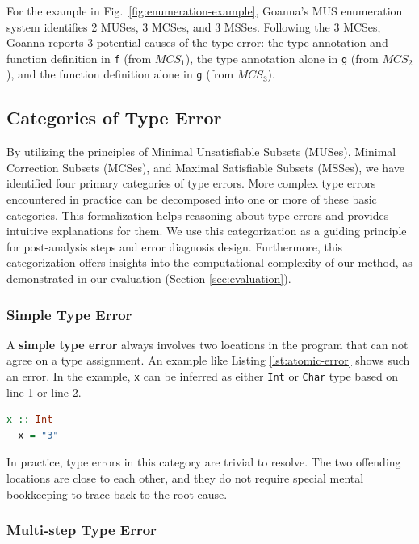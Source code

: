 \documentclass[pdflatex,lineno,sn-nature,Numbered]{sn-jnl}%
\begin{document}
   For the example in Fig.~\ref{fig:enumeration-example}, Goanna's MUS enumeration system identifies 2 MUSes, 3 MCSes, and 3 MSSes. Following the 3 MCSes, Goanna reports 3 potential causes of the type error: the type annotation and function definition in \texttt{f} (from $MCS_1$), the type annotation alone in \texttt{g} (from $MCS_2$), and the function definition alone in \texttt{g} (from $MCS_3$). 


\subsection{Categories of Type Error} \label{sec:categories}

By utilizing the principles of Minimal Unsatisfiable Subsets (MUSes), Minimal Correction Subsets (MCSes), and Maximal Satisfiable Subsets (MSSes), we have identified four primary categories of type errors. More complex type errors encountered in practice can be decomposed into one or more of these basic categories. This formalization helps reasoning about type errors and provides intuitive explanations for them. We use this categorization as a guiding principle for post-analysis steps and error diagnosis design. Furthermore, this categorization offers insights into the computational complexity of our method, as demonstrated in our evaluation (Section \ref{sec:evaluation}).

\subsubsection*{Simple Type Error}
A \textbf{simple type error} always involves two locations in the program that can not agree on a type assignment. An example like Listing \ref{lst:atomic-error} shows such an error. In the example, {\tt x} can be inferred as either {\tt Int} or {\tt Char} type based on line 1 or line 2. 

\begin{lstlisting}[language=Haskell, caption=An example of a simple type error, label={lst:atomic-error}]
  x :: Int
  x = "3"
\end{lstlisting}

In practice, type errors in this category are trivial to resolve. The two offending locations are close to each other, and they do not require special mental bookkeeping to trace back to the root cause. 

\subsubsection*{Multi-step Type Error}
\end{document}

